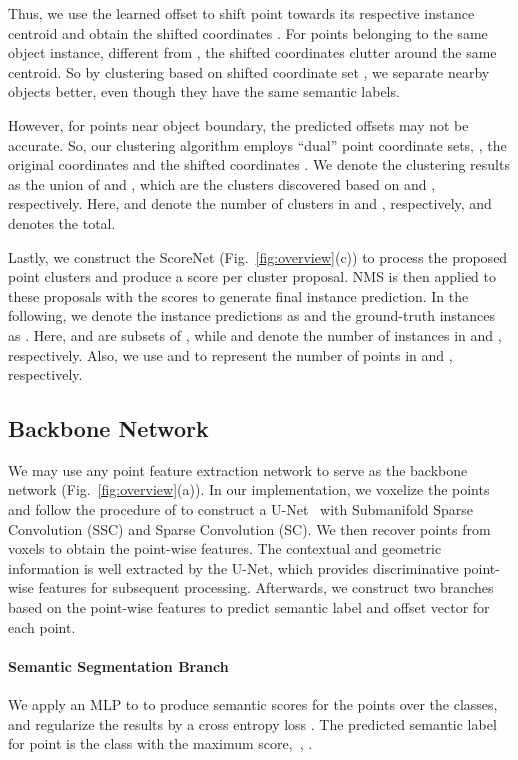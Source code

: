 \documentclass[10pt,twocolumn,letterpaper]{article}
\begin{document}
Thus, we 
use the learned offset  to shift point  towards its respective instance centroid and obtain the shifted coordinates . 
For points belonging to the same object instance, different from , the shifted coordinates  clutter around the same centroid. So by clustering based on shifted coordinate set , we separate nearby objects better, even though they have the same semantic labels.

However, for points near object boundary, the predicted offsets may not be accurate.
So, our clustering algorithm employs ``dual'' point coordinate sets, \ie, the original coordinates  and the shifted coordinates .
We denote the clustering results  as the union of  and , which are the clusters discovered based on  and , respectively. Here,  
 and  denote the number of clusters in  and , respectively, and 
 denotes the total.

Lastly, we construct the ScoreNet (Fig.~\ref{fig:overview}(c)) to process the proposed point clusters  and produce a score per cluster proposal.
NMS is then applied to these proposals with the scores to generate final instance prediction.
In the following, we denote the instance predictions as  and the ground-truth instances as .
Here,  and  are subsets of  , while  and  denote the number of instances in  and , respectively.
Also, we use  and  to represent the number of points in  and , respectively.


\subsection{Backbone Network}
We may use any point feature extraction network to serve as the backbone network (Fig.~\ref{fig:overview}(a)).
In our implementation, we voxelize the points and follow the procedure of \cite{graham20183d} to construct a U-Net~\cite{li2019gs3d,ronneberger2015unet} with Submanifold Sparse Convolution (SSC) and Sparse Convolution (SC).
We then recover points from voxels to obtain the point-wise features. 
The contextual and geometric information is well extracted by the U-Net, which provides discriminative point-wise features  for subsequent processing.
Afterwards, we construct two branches based on the point-wise features  to predict semantic label  and offset vector  for each point.

\paragraph{Semantic Segmentation Branch}
We apply an MLP to  to produce semantic scores  for the  points over the  classes, and regularize the results by a cross entropy loss .
The predicted semantic label  for point  is the class with the maximum score,~\ie, .
\end{document}
